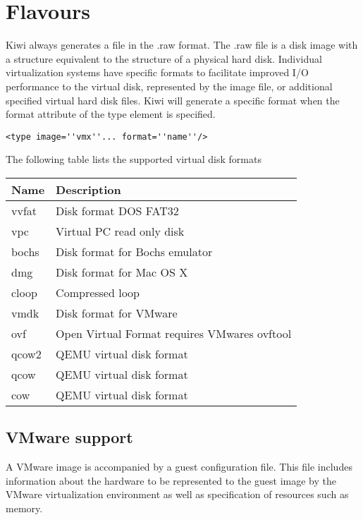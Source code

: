 \section{Flavours}

Kiwi always generates a file in the .raw format. The .raw file is a disk
image with a structure equivalent to the structure of a physical hard disk. 
Individual virtualization systems have specific formats to facilitate
improved I/O performance to the virtual disk, represented by the image file,
or additional specified virtual hard disk files. Kiwi will generate a 
specific format when the format attribute of the type element is specified.


\begin{Command}{12cm}
\begin{verbatim}
<type image=''vmx''... format=''name''/>
\end{verbatim}
\end{Command}

The following table lists the supported virtual disk formats

\begin{tabular}[h]{|p{2cm}|p{9cm}|}
\hline
\textbf{Name} & \textbf{Description} \\
\hline
vvfat       & Disk format DOS FAT32 \\
vpc         & Virtual PC read only disk  \\
bochs       & Disk format for Bochs emulator  \\
dmg         & Disk format for Mac OS X \\
cloop       & Compressed loop \\
vmdk        & Disk format for VMware \\
ovf         & Open Virtual Format requires VMwares ovftool \\
qcow2       & QEMU virtual disk format  \\
qcow        & QEMU virtual disk format  \\
cow         & QEMU virtual disk format \\
\hline
\end{tabular}

\subsection{VMware support}

A VMware image is accompanied by a guest configuration file. This file 
includes information about the hardware to be represented to the guest 
image by the VMware virtualization environment as well as specification
of resources such as memory. 

